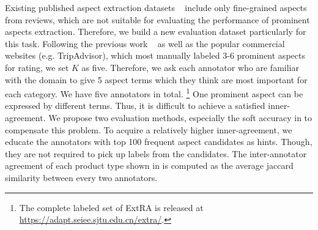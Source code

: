 Existing published aspect extraction datasets ~\cite{hu2004mining,popescu2007extracting,pavlopoulos2014aspect,ding2008holistic} 
include only fine-grained aspects from reviews,
which are not suitable for evaluating the performance of 
prominent aspects extraction. 
Therefore, we build a new evaluation dataset particularly 
for this task.
Following the previous work 
 ~\cite{ganu2009beyond,brody2010unsupervised,zhao2010jointly,wang2015sentiment} as well as
the popular commercial websites (e.g. TripAdvisor), 
which most manually labeled 3-6 prominent aspects for
rating, we set $K$ as five.
Therefore,  
we ask each annotator who are familiar with the domain 
to give 5 aspect terms which they think are most important
for each category. We have five annotators in total.
\footnote{The 
	complete labeled set of ExtRA is released at \url{https://adapt.seiee.sjtu.edu.cn/extra/}.
}
One prominent aspect can be expressed by different terms.
Thus, it is difficult to achieve a satisfied inner-agreement.
We propose two evaluation methods, especially the 
soft accuracy in  to compensate this problem.
To acquire a relatively higher inner-agreement, 
we educate the annotators with top 100 frequent aspect candidates
as hints. Though, they are not required to pick up labels from 
the candidates.
The inter-annotator agreement of each
product type shown in  is computed as the average jaccard similarity between every two annotators.


